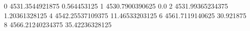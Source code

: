 0 4531.3544921875 0.564453125
1 4530.7900390625 0.0
2 4531.99365234375 1.20361328125
4 4542.25537109375 11.46533203125
6 4561.7119140625 30.921875
8 4566.21240234375 35.42236328125
